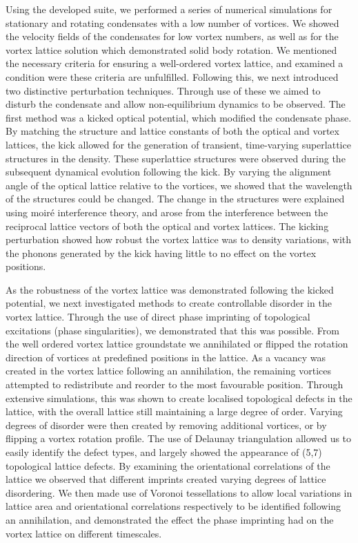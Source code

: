 Using the developed suite, we performed a series of numerical simulations for stationary and rotating condensates with a low number of vortices. We showed the velocity fields of the condensates for low vortex numbers, as well as for the vortex lattice solution which demonstrated solid body rotation. We mentioned the necessary criteria for ensuring a well-ordered vortex lattice, and examined a condition were these criteria are unfulfilled. Following this, we next introduced two distinctive perturbation techniques. Through use of these we aimed to disturb the condensate and allow non-equilibrium dynamics to be observed. The first method was a kicked optical potential, which modified the condensate phase. By matching the structure and lattice constants of both the optical and vortex lattices, the kick allowed for the generation of transient, time-varying superlattice structures in the density. These superlattice structures were observed during the subsequent dynamical evolution following the kick. By varying the alignment angle of the optical lattice relative to the vortices, we showed that the wavelength of the structures could be changed. The change in the structures were explained using moir\'e interference theory, and arose from the interference between the reciprocal lattice vectors of both the optical and vortex lattices. The kicking perturbation showed how robust the vortex lattice was to density variations, with the phonons generated by the kick having little to no effect on the vortex positions.

As the robustness of the vortex lattice was demonstrated following the kicked potential, we next investigated methods to create controllable disorder in the vortex lattice. Through the use of direct phase imprinting of topological excitations (phase singularities), we demonstrated that this was possible. From the well ordered vortex lattice groundstate we annihilated or flipped the rotation direction of vortices at predefined positions in the lattice. As a vacancy was created in the vortex lattice following an annihilation, the remaining vortices attempted to redistribute and reorder to the most favourable position. Through extensive simulations, this was shown to create localised topological defects in the lattice, with the overall lattice still maintaining a large degree of order. Varying degrees of disorder were then created by removing additional vortices, or by flipping a vortex rotation profile. The use of Delaunay triangulation allowed us to easily identify the defect types, and largely showed the appearance of (5,7) topological lattice defects. By examining the orientational correlations of the lattice we observed that different imprints created varying degrees of lattice disordering. We then made use of Voronoi tessellations to allow local variations in lattice area and orientational correlations respectively to be identified following an annihilation, and demonstrated the effect the phase imprinting had on the vortex lattice on different timescales.

